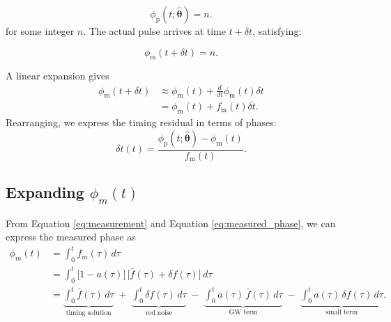 \documentclass{tufte-handout} %
\begin{document}
\begin{equation}
	\phi_{\text{p}}(t; \boldsymbol{\hat{\theta}}) = n.
	\end{equation}
for some integer $n$. The actual pulse arrives at time $t + \delta t$, satisfying:

\begin{equation}
	\phi_{\text{m}}(t + \delta t) = n.
\end{equation}

\noindent A linear expansion gives
\begin{align}
	\phi_{\text{m}}(t + \delta t)  &\approx \phi_{\text{m}}(t) + \frac{d}{dt} \phi_{\text{m}}(t) \delta t \nonumber \\
	&= \phi_{\text{m}}(t) + f_{\text{m}}(t) \delta t. \label{eq:assumption 1}
\end{align}
Rearranging, we express the timing residual in terms of phases:
\begin{equation}
	\delta t (t)= \frac{\phi_{\text{p}}(t; \boldsymbol{\hat{\theta}}) - \phi_{\text{m}}(t)}{f_{\text{m}}(t)}. \label{eq:delta_t}
\end{equation}


\subsection{Expanding $\phi_m(t)$}
From Equation \eqref{eq:measurement} and Equation \eqref{eq:measured_phase}, we can express the measured phase as
\begin{align}
	\phi_m(t)
	&= \int_{0}^{t} f_m(\tau)\,d\tau \\
	&= \int_{0}^{t} 
	\bigl[1 - a(\tau)\bigr]\,
	\bigl[\bar{f}(\tau) + \delta f(\tau)\bigr]\,d\tau \\
	&= \underbrace{\int_{0}^{t} \bar{f}(\tau)\,d\tau}_{\text{timing solution}}
	\;+\;
	\underbrace{\int_{0}^{t} \delta f(\tau)\,d\tau}_{\text{red noise}}
	\;-\;
	\underbrace{\int_{0}^{t} a(\tau)\,\bar{f}(\tau)\,d\tau}_{\text{GW term}}
	\;-\;
	\underbrace{\int_{0}^{t} a(\tau)\,\delta f(\tau)\,d\tau}_{\text{small term}}. \label{eq:phi_m_decomposed}
\end{align}
\end{document}
